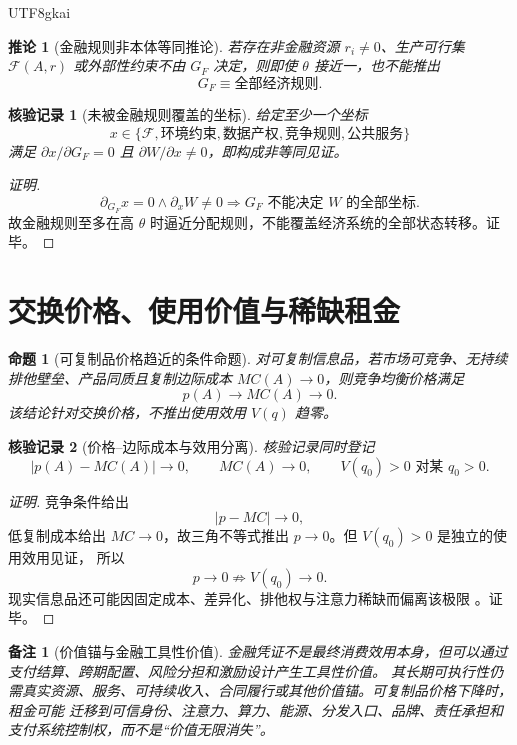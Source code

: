\documentclass[12pt,a4paper,openany]{report}
\newtheorem{proposition}{命题}[chapter]
\newtheorem{corollary}{推论}[chapter]
\newtheorem{remark}{备注}[chapter]
\newtheorem{Certificate}{核验记录}[chapter]
\newcommand{\Feas}{\mathcal F}
\newcommand{\Abs}[1]{\left\lvert #1\right\rvert}
\begin{document}
\begin{CJK*}{UTF8}{gkai}
\begin{corollary}[金融规则非本体等同推论]
\label{cor:finance-not-total-economy}
若存在非金融资源 \(r_i\ne0\)、生产可行集 \(\Feas(A,r)\) 或外部性约束不由 \(G_F\) 决定，则即使
\(\theta\) 接近一，也不能推出
\[
  G_F\equiv\text{全部经济规则}.
\]
\end{corollary}

\begin{Certificate}[未被金融规则覆盖的坐标]
给定至少一个坐标
\[
  x\in\{\Feas,\text{环境约束},\text{数据产权},\text{竞争规则},\text{公共服务}\}
\]
满足 \(\partial x/\partial G_F=0\) 且 \(\partial W/\partial x\ne0\)，即构成非等同见证。
\end{Certificate}

\begin{proof}[证明]
\[
  \partial_{G_F}x=0
  \wedge
  \partial_xW\ne0
  \Longrightarrow
  G_F\text{ 不能决定 }W\text{ 的全部坐标}.
\]
故金融规则至多在高 \(\theta\) 时逼近分配规则，不能覆盖经济系统的全部状态转移。证毕。
\end{proof}

\section{交换价格、使用价值与稀缺租金}

\begin{proposition}[可复制品价格趋近的条件命题]
\label{prop:replicable-price-limit}
对可复制信息品，若市场可竞争、无持续排他壁垒、产品同质且复制边际成本
\(MC(A)\to0\)，则竞争均衡价格满足
\[
  p(A)\to MC(A)\to0.
\]
该结论针对交换价格，不推出使用效用 \(V(q)\) 趋零。
\end{proposition}

\begin{Certificate}[价格--边际成本与效用分离]
核验记录同时登记
\[
  \Abs{p(A)-MC(A)}\to0,\qquad
  MC(A)\to0,\qquad
  V(q_0)>0\text{ 对某 }q_0>0.
\]
\end{Certificate}

\begin{proof}[证明]
竞争条件给出
\[
  \Abs{p-MC}\to0,
\]
低复制成本给出 \(MC\to0\)，故三角不等式推出 \(p\to0\)。但 \(V(q_0)>0\) 是独立的使用效用见证，
所以
\[
  p\to0\not\Longrightarrow V(q_0)\to0.
\]
现实信息品还可能因固定成本、差异化、排他权与注意力稀缺而偏离该极限
\cite{Varian1998InformationGoods}。证毕。
\end{proof}

\begin{remark}[价值锚与金融工具性价值]
金融凭证不是最终消费效用本身，但可以通过支付结算、跨期配置、风险分担和激励设计产生工具性价值。
其长期可执行性仍需真实资源、服务、可持续收入、合同履行或其他价值锚。可复制品价格下降时，租金可能
迁移到可信身份、注意力、算力、能源、分发入口、品牌、责任承担和支付系统控制权，而不是“价值无限消失”。
\end{remark}
\clearpage

\end{CJK*}
\end{document}
